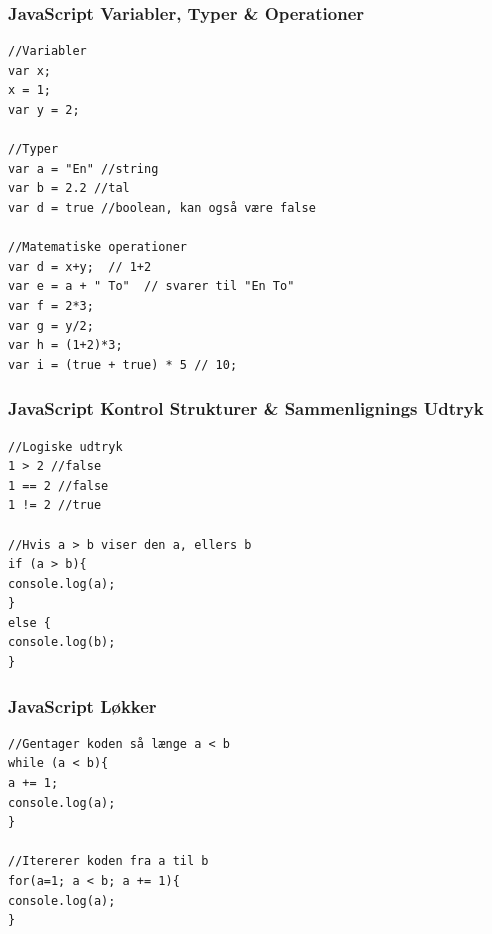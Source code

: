 \documentclass[10pt]{beamer}
\begin{document}
\begin{frame}[fragile]
 \frametitle{JavaScript Variabler, Typer \& Operationer}

\begin{lstlisting}
//Variabler
var x;
x = 1;
var y = 2;

//Typer
var a = "En" //string
var b = 2.2 //tal
var d = true //boolean, kan også være false

//Matematiske operationer
var d = x+y;  // 1+2
var e = a + " To"  // svarer til "En To"
var f = 2*3;
var g = y/2;
var h = (1+2)*3;
var i = (true + true) * 5 // 10;
\end{lstlisting}
\end{frame}

 
\begin{frame}[fragile]
\frametitle{JavaScript Kontrol Strukturer \& Sammenlignings Udtryk}
\begin{lstlisting}
//Logiske udtryk
1 > 2 //false
1 == 2 //false
1 != 2 //true

//Hvis a > b viser den a, ellers b
if (a > b){
console.log(a);
}
else {
console.log(b);
}
\end{lstlisting}
\end{frame}


\begin{frame}[fragile]
\frametitle{JavaScript Løkker}
\begin{lstlisting}
//Gentager koden så længe a < b
while (a < b){
a += 1;
console.log(a);
}

//Itererer koden fra a til b
for(a=1; a < b; a += 1){
console.log(a);
}
\end{lstlisting}
\end{frame}
\end{document}
